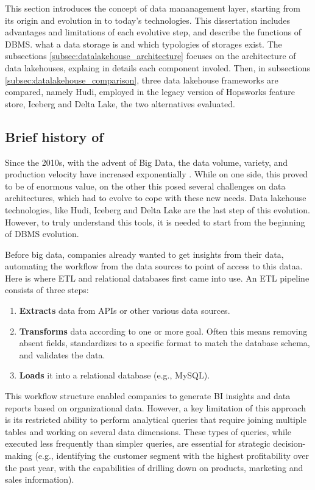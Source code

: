 This section introduces the concept of data mananagement layer, starting from its origin and evolution in to today's technologies. This dissertation includes advantages and limitations of each evolutive step, and describe the functions of \gls{DBMS}. what a data storage is and which typologies of storages exist. The subsections \ref{subsec:datalakehouse_architecture} focuses on the architecture of data lakehouses, explaing in details each component involed. Then, in subsections \ref{subsec:datalakehouse_comparison}, three data lakehouse frameworks are compared, namely Hudi, employed in the legacy version of Hopsworks feature store, Iceberg and Delta Lake, the two alternatives evaluated.

\subsection{Brief history of }
\label{subsec:history_DBMS}
Since the 2010s, with the advent of Big Data, the data volume, variety, and production velocity have increased exponentially \cite{ederUnstructuredData802008, penceWhatBigData2014}. While on one side, this proved to be of enormous value, on the other this posed several challenges \cite{demchenkoAddressingBigData2012} on data architectures, which had to evolve to cope with these new needs. Data lakehouse technologies, like Hudi, Iceberg and Delta Lake \cite{rajaperumalUberEngineeringIncremental2017,IcebergExamples2024,armbrustDeltaLakeHighperformance2020} are the last step of this evolution. However, to truly understand this tools, it is needed to start from the beginning of \gls{DBMS} evolution.

\smallskip

Before big data, companies already wanted to get insights from their data, automating the workflow from the data sources to point of access to this dataa. Here is where \gls{ETL} and relational databases first came into use. An \gls{ETL} pipeline consists of three steps:
\begin{enumerate}
    \item \textbf{Extracts} data from \glspl{API} or other various data sources.
    \item \textbf{Transforms} data according to one or more goal. Often this means removing absent fields, standardizes to a specific format to match the database schema, and validates the data.
    \item \textbf{Loads} it into a relational database (e.g., MySQL).
\end{enumerate}
This workflow structure enabled companies to generate \gls{BI} insights and data reports based on organizational data. However, a key limitation of this approach is its restricted ability to perform analytical queries that require joining multiple tables and working on several data dimensions. These types of queries, while executed less frequently than simpler queries, are essential for strategic decision-making (e.g., identifying the customer segment with the highest profitability over the past year, with the capabilities of drilling down on products, marketing and sales information).

